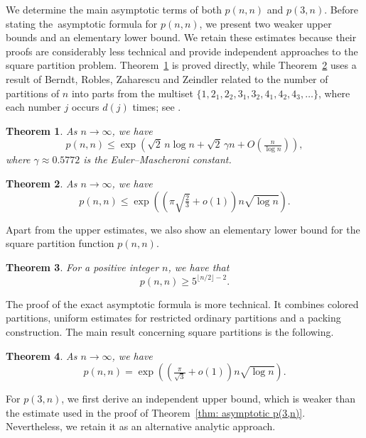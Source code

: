 \documentclass[12pt,a4paper]{amsart}
\numberwithin{equation}{section}
\theoremstyle{plain}
\newtheorem{thm}{Theorem}[section]
\theoremstyle{definition}
\theoremstyle{remark}
\begin{document}
We determine the main asymptotic terms of both $p(n,n)$ and $p(3,n)$. Before stating the~asymptotic formula for $p(n,n)$, we present two weaker upper bounds and an elementary lower bound. We retain these estimates because their proofs are considerably less technical and provide independent approaches to the square partition problem. Theorem~\ref{thm: p(n,n) UB} is proved directly, while Theorem~\ref{p(n,n)stronger} uses a result of Berndt, Robles, Zaharescu and Zeindler related to the number of partitions of $n$ into parts from the multiset $\{1,2_1,2_2,3_1,3_2,4_1,4_2,4_3,\ldots\}$, where each number $j$ occurs $d(j)$ times; see \cite{BerndtRoblesZaharescuZeindler}.






\begin{thm}\label{thm: p(n,n) UB}
As $n\to\infty$, we have
$$
p(n,n)
\le
\exp\left(
\sqrt2\,n\log n+\sqrt2\,\gamma n
+O\!\left(\tfrac{n}{\log n}\right)
\right),
$$
where $\gamma\approx 0.5772$ is the Euler--Mascheroni constant.
\end{thm}

\begin{thm}\label{p(n,n)stronger} 
As $n\to\infty$, we have
 $$p(n,n)\le \exp\left(\left(\pi\sqrt{\tfrac23}+o(1)\right)n\sqrt{\log n}\right).$$
 \end{thm}
Apart from the upper estimates, we also show an elementary lower bound for the square partition function $p(n,n)$.

\begin{thm}\label{thm: p(n,n) LB}
    For a positive integer $n$, we have that
    $$p(n,n)\ge 5^{\lfloor n/2\rfloor-2}.$$
\end{thm}
The proof of the exact asymptotic formula is more technical. It combines colored partitions, uniform estimates for restricted ordinary partitions and a packing construction. The main result concerning square partitions is the following. 
\begin{thm}\label{asymp(n,n)}
As $n\to\infty$, we have
$$
p(n,n)
=
\exp\left(
\left(\tfrac{\pi}{\sqrt3}+o(1)\right)n\sqrt{\log n}
\right).
$$
\end{thm}

For $p(3,n)$, we first derive an independent upper bound, which is weaker than the estimate used in the proof of Theorem~\ref{thm: asymptotic p(3,n)}. Nevertheless, we retain it as an alternative analytic approach. %
\end{document}

